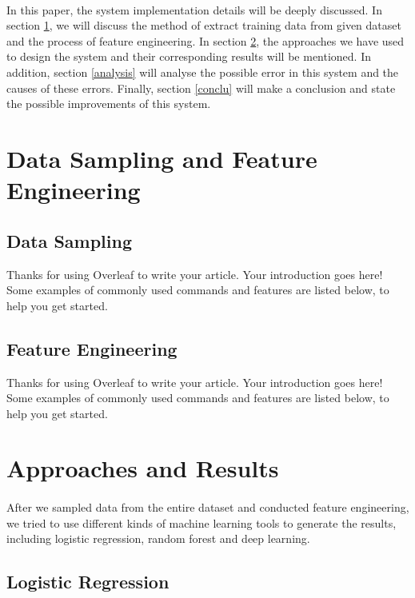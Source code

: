 \documentclass[fleqn,11pt]{olplainarticle}
\begin{document}
\paragraph*{}
In this paper, the system implementation details will be deeply discussed. In section \ref{datafeature}, we will discuss the method of extract training data from given dataset and the process of feature engineering. In section \ref{appres}, the approaches we have used to design the system and their corresponding results will be mentioned. In addition, section \ref{analysis} will analyse the possible error in this system and the causes of these errors. Finally, section \ref{conclu} will make a conclusion and state the possible improvements of this system.



\section{Data Sampling and Feature Engineering}\label{datafeature}

\subsection{Data Sampling}\label{data}
Thanks for using Overleaf to write your article. Your introduction goes here! Some examples of commonly used commands and features are listed below, to help you get started.

\subsection{Feature Engineering}\label{feature}
Thanks for using Overleaf to write your article. Your introduction goes here! Some examples of commonly used commands and features are listed below, to help you get started.

\section{Approaches and Results}\label{appres}
\paragraph*{}
After we sampled data from the entire dataset and conducted feature engineering, we tried to use different kinds of machine learning tools to generate the results, including logistic regression, random forest and deep learning.

\subsection{Logistic Regression}\label{lr}
\end{document}
